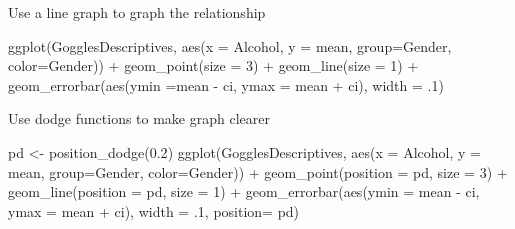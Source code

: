 \documentclass[
]{book}
\newenvironment{Shaded}{\begin{snugshade}}{\end{snugshade}}
\newcommand{\AttributeTok}[1]{\textcolor[rgb]{0.77,0.63,0.00}{#1}}
\newcommand{\DecValTok}[1]{\textcolor[rgb]{0.00,0.00,0.81}{#1}}
\newcommand{\FloatTok}[1]{\textcolor[rgb]{0.00,0.00,0.81}{#1}}
\newcommand{\FunctionTok}[1]{\textcolor[rgb]{0.00,0.00,0.00}{#1}}
\newcommand{\NormalTok}[1]{#1}
\newcommand{\OtherTok}[1]{\textcolor[rgb]{0.56,0.35,0.01}{#1}}
\newcommand{\SpecialCharTok}[1]{\textcolor[rgb]{0.00,0.00,0.00}{#1}}
\begin{document}
Use a line graph to graph the relationship

\begin{Shaded}
\begin{Highlighting}[]
\FunctionTok{ggplot}\NormalTok{(GogglesDescriptives, }\FunctionTok{aes}\NormalTok{(}\AttributeTok{x =}\NormalTok{ Alcohol,}
                     \AttributeTok{y =}\NormalTok{ mean, }
                     \AttributeTok{group=}\NormalTok{Gender, }
                     \AttributeTok{color=}\NormalTok{Gender)) }\SpecialCharTok{+}
  \FunctionTok{geom\_point}\NormalTok{(}\AttributeTok{size =} \DecValTok{3}\NormalTok{) }\SpecialCharTok{+}
  \FunctionTok{geom\_line}\NormalTok{(}\AttributeTok{size =} \DecValTok{1}\NormalTok{) }\SpecialCharTok{+}
  \FunctionTok{geom\_errorbar}\NormalTok{(}\FunctionTok{aes}\NormalTok{(}\AttributeTok{ymin  =}\NormalTok{mean }\SpecialCharTok{{-}}\NormalTok{ ci, }
                    \AttributeTok{ymax =}\NormalTok{ mean }\SpecialCharTok{+}\NormalTok{ ci), }
                \AttributeTok{width =}\NormalTok{ .}\DecValTok{1}\NormalTok{)}
\end{Highlighting}
\end{Shaded}

Use dodge functions to make graph clearer

\begin{Shaded}
\begin{Highlighting}[]
\NormalTok{pd }\OtherTok{\textless{}{-}} \FunctionTok{position\_dodge}\NormalTok{(}\FloatTok{0.2}\NormalTok{)}
\FunctionTok{ggplot}\NormalTok{(GogglesDescriptives, }
       \FunctionTok{aes}\NormalTok{(}\AttributeTok{x =}\NormalTok{ Alcohol, }
           \AttributeTok{y =}\NormalTok{ mean, }
           \AttributeTok{group=}\NormalTok{Gender, }
           \AttributeTok{color=}\NormalTok{Gender)) }\SpecialCharTok{+}
  \FunctionTok{geom\_point}\NormalTok{(}\AttributeTok{position =}\NormalTok{ pd, }
             \AttributeTok{size =} \DecValTok{3}\NormalTok{) }\SpecialCharTok{+}
  \FunctionTok{geom\_line}\NormalTok{(}\AttributeTok{position =}\NormalTok{ pd,}
            \AttributeTok{size =} \DecValTok{1}\NormalTok{) }\SpecialCharTok{+}
  \FunctionTok{geom\_errorbar}\NormalTok{(}\FunctionTok{aes}\NormalTok{(}\AttributeTok{ymin =}\NormalTok{ mean }\SpecialCharTok{{-}}\NormalTok{ ci, }
                    \AttributeTok{ymax =}\NormalTok{ mean }\SpecialCharTok{+}\NormalTok{ ci), }
                \AttributeTok{width =}\NormalTok{ .}\DecValTok{1}\NormalTok{, }
                \AttributeTok{position=}\NormalTok{ pd)}
\end{Highlighting}
\end{Shaded}
\end{document}
